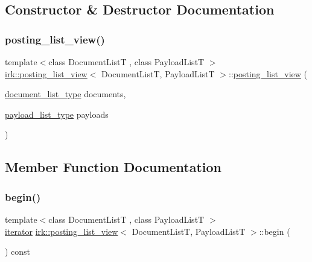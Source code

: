 \subsection{Constructor \& Destructor Documentation}
\mbox{\label{classirk_1_1posting__list__view_a2a67139a8790a38cffe1f20323c96bd2}} 
\subsubsection{\texorpdfstring{posting\+\_\+list\+\_\+view()}{posting\_list\_view()}}
{\footnotesize\ttfamily template$<$class Document\+ListT , class Payload\+ListT $>$ \\
\mbox{\hyperlink{classirk_1_1posting__list__view}{irk\+::posting\+\_\+list\+\_\+view}}$<$ Document\+ListT, Payload\+ListT $>$\+::\mbox{\hyperlink{classirk_1_1posting__list__view}{posting\+\_\+list\+\_\+view}} (\begin{DoxyParamCaption}\item[{\mbox{\hyperlink{classirk_1_1posting__list__view_ae024545dbbb464926a2024d956b7b7af}{document\+\_\+list\+\_\+type}}}]{documents,  }\item[{\mbox{\hyperlink{classirk_1_1posting__list__view_aabf1afcb3a994971f30879354301e1fe}{payload\+\_\+list\+\_\+type}}}]{payloads }\end{DoxyParamCaption})\hspace{0.3cm}{\ttfamily [inline]}}



\subsection{Member Function Documentation}
\mbox{\label{classirk_1_1posting__list__view_a62065bb4544ebf8d6425b608a0852c11}} 
\subsubsection{\texorpdfstring{begin()}{begin()}}
{\footnotesize\ttfamily template$<$class Document\+ListT , class Payload\+ListT $>$ \\
\mbox{\hyperlink{classirk_1_1posting__list__view_1_1iterator}{iterator}} \mbox{\hyperlink{classirk_1_1posting__list__view}{irk\+::posting\+\_\+list\+\_\+view}}$<$ Document\+ListT, Payload\+ListT $>$\+::begin (\begin{DoxyParamCaption}{ }\end{DoxyParamCaption}) const\hspace{0.3cm}{\ttfamily [inline]}}

